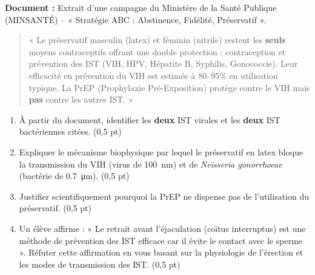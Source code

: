 \documentclass[11pt]{article}
\begin{document}
\begin{exercice}
\textbf{Document :} Extrait d'une campagne du Ministère de la Santé Publique (MINSANTÉ) -- « Stratégie ABC : Abstinence, Fidélité, Préservatif ».
\begin{quote}
« Le préservatif masculin (latex) et féminin (nitrile) restent les \textbf{seuls} moyens contraceptifs offrant une double protection : contraception et prévention des IST (VIH, HPV, Hépatite B, Syphilis, Gonococcie). Leur efficacité en prévention du VIH est estimée à 80--95\% en utilisation typique. La PrEP (Prophylaxie Pré-Exposition) protège contre le VIH mais \textbf{pas} contre les autres IST. »
\end{quote}

\begin{enumerate}
    \item À partir du document, identifier les \textbf{deux} IST virales et les \textbf{deux} IST bactériennes citées. (0,5 pt)
    \item Expliquer le mécanisme biophysique par lequel le préservatif en latex bloque la transmission du VIH (virus de \SI{100}{\nano\meter}) et de \textit{Neisseria gonorrhoeae} (bactérie de \SI{0,7}{\micro\meter}). (0,5 pt)
    \item Justifier scientifiquement pourquoi la PrEP ne dispense pas de l'utilisation du préservatif. (0,5 pt)
    \item Un élève affirme : « Le retrait avant l'éjaculation (coïtus interruptus) est une méthode de prévention des IST efficace car il évite le contact avec le sperme ». Réfuter cette affirmation en vous basant sur la physiologie de l'érection et les modes de transmission des IST. (0,5 pt)
\end{enumerate}
\end{exercice}
\end{document}

